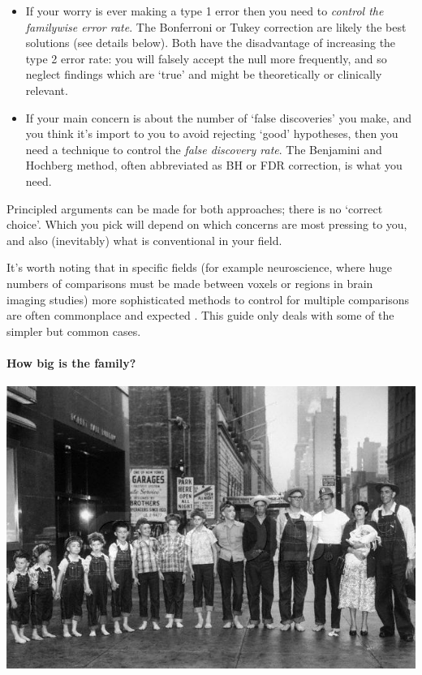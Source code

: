 \documentclass[]{article}
\let\oldparagraph\paragraph
\renewcommand{\paragraph}[1]{\oldparagraph{#1}\mbox{}}
\begin{document}
\begin{itemize}
\item
  If your worry is ever making a type 1 error then you need to \emph{control the
  familywise error rate}. The Bonferroni or Tukey correction are likely the
  best solutions (see details below). Both have the disadvantage of increasing
  the type 2 error rate: you will falsely accept the null more frequently, and
  so neglect findings which are `true' and might be theoretically or
  clinically relevant.
\item
  If your main concern is about the number of `false discoveries' you make,
  and you think it's import to you to avoid rejecting `good' hypotheses, then
  you need a technique to control the \emph{false discovery rate}. The Benjamini
  and Hochberg method, often abbreviated as BH or FDR correction, is what you
  need.
\end{itemize}

Principled arguments can be made for both approaches; there is no `correct
choice'. Which you pick will depend on which concerns are most pressing to you,
and also (inevitably) what is conventional in your field.

{It's worth noting that in specific fields (for example neuroscience, where huge
numbers of comparisons must be made between voxels or regions in brain imaging
studies) more sophisticated methods to control for multiple comparisons are
often commonplace and expected \citep{nichols2003controlling}. This guide only deals
with some of the simpler but common cases.}

\hypertarget{how-big-is-the-family}{%
\paragraph{How big is the family?}\label{how-big-is-the-family}}

\includegraphics{media/large-family.jpg}
\end{document}
